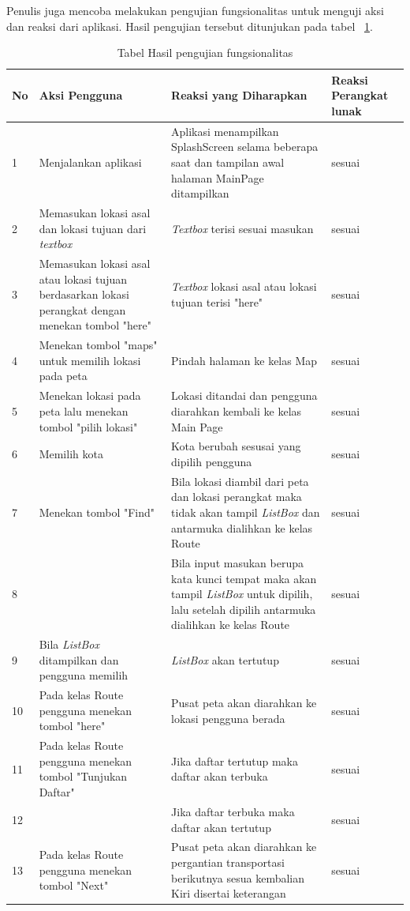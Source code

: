 Penulis juga mencoba melakukan pengujian fungsionalitas untuk menguji aksi dan reaksi dari aplikasi. Hasil pengujian tersebut ditunjukan pada tabel ~\ref{tab:TabelHasilPengujianFungsionalitas}.
\begin{table}[h!]
	\centering
		\begin{tabular}{|p{1cm}|p{4cm}|p{6cm}|p{3cm}|}\hline
				No & Aksi Pengguna & Reaksi yang Diharapkan & Reaksi Perangkat lunak \\ \hline
				1 & Menjalankan aplikasi & Aplikasi menampilkan SplashScreen selama beberapa saat dan tampilan awal halaman MainPage ditampilkan & sesuai \\ \hline
				2 & Memasukan lokasi asal dan lokasi tujuan dari \textit{textbox} & \textit{Textbox} terisi sesuai masukan & sesuai \\ \hline
				3 & Memasukan lokasi asal atau lokasi tujuan berdasarkan lokasi perangkat dengan menekan tombol "here" & \textit{Textbox} lokasi asal atau lokasi tujuan terisi "here" & sesuai \\ \hline
				4 & Menekan tombol "maps" untuk memilih lokasi pada peta & Pindah halaman ke kelas Map & sesuai \\ \hline
				5 & Menekan lokasi pada peta lalu menekan tombol "pilih lokasi" & Lokasi ditandai dan pengguna diarahkan kembali ke kelas Main Page & sesuai \\ \hline
				6 & Memilih kota & Kota berubah sesusai yang dipilih pengguna & sesuai \\ \hline
				7 & Menekan tombol "Find" & Bila lokasi diambil dari peta dan lokasi perangkat maka tidak akan tampil \textit{ListBox} dan antarmuka dialihkan ke kelas Route & sesuai \\ \hline
				8 & & Bila input masukan berupa kata kunci tempat maka akan tampil \textit{ListBox} untuk dipilih, lalu setelah dipilih antarmuka dialihkan ke kelas Route & sesuai \\ \hline
				9 & Bila \textit{ListBox} ditampilkan dan pengguna memilih & \textit{ListBox} akan tertutup & sesuai \\ \hline
				10 & Pada kelas Route pengguna menekan tombol "here" & Pusat peta akan diarahkan ke lokasi pengguna berada & sesuai \\ \hline
				11 & Pada kelas Route pengguna menekan tombol "Tunjukan Daftar" & Jika daftar tertutup maka daftar akan terbuka & sesuai \\ \hline
				12 & & Jika daftar terbuka maka daftar akan tertutup & sesuai \\ \hline
				13 & Pada kelas Route pengguna menekan tombol "Next" & Pusat peta akan diarahkan ke pergantian transportasi berikutnya sesua kembalian Kiri disertai keterangan & sesuai \\ \hline
		\end{tabular}
	\caption{Tabel Hasil pengujian fungsionalitas}
	\label{tab:TabelHasilPengujianFungsionalitas}
\end{table}


